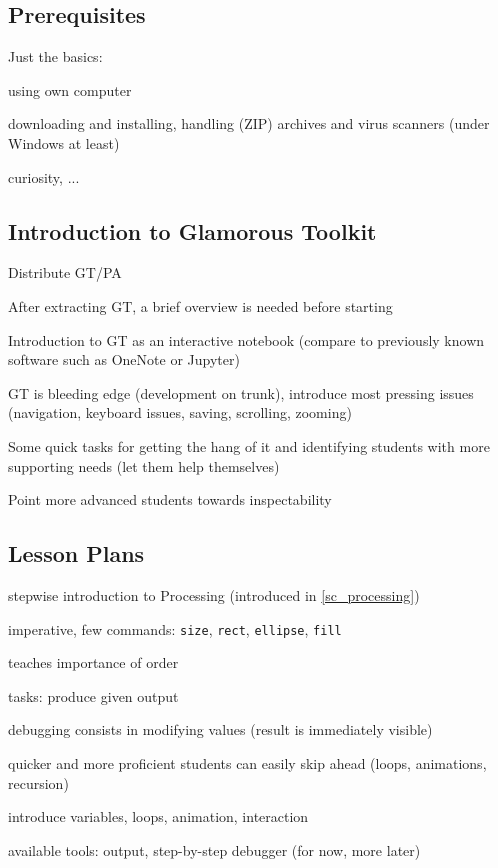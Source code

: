 \subsection{Prerequisites}

Just the basics:
\begin{todo}
\item using own computer
\item downloading and installing, handling (ZIP) archives and virus scanners (under Windows at least)
\item curiosity, ...
\end{todo}

\subsection{Introduction to Glamorous Toolkit} \label{ssc_lesson_gt}

\begin{todo}
\item Distribute GT/PA
\item After extracting GT, a brief overview is needed before starting
\item Introduction to GT as an interactive notebook (compare to previously known software such as OneNote or Jupyter)
\item GT is bleeding edge (development on trunk), introduce most pressing issues (navigation, keyboard issues, saving, scrolling, zooming)
\item Some quick tasks for getting the hang of it and identifying students with more supporting needs (let them help themselves)
\item Point more advanced students towards inspectability
\end{todo}

\subsection{Lesson Plans}

\begin{todo}
\item stepwise introduction to Processing (introduced in \ref{sc_processing})
\item imperative, few commands: \texttt{size}, \texttt{rect}, \texttt{ellipse}, \texttt{fill}
\item teaches importance of order
\item tasks: produce given output
\item debugging consists in modifying values (result is immediately visible)
\item quicker and more proficient students can easily skip ahead (loops, animations, recursion)
\item introduce variables, loops, animation, interaction
\item available tools: output, step-by-step debugger (for now, more later)
\end{todo}


